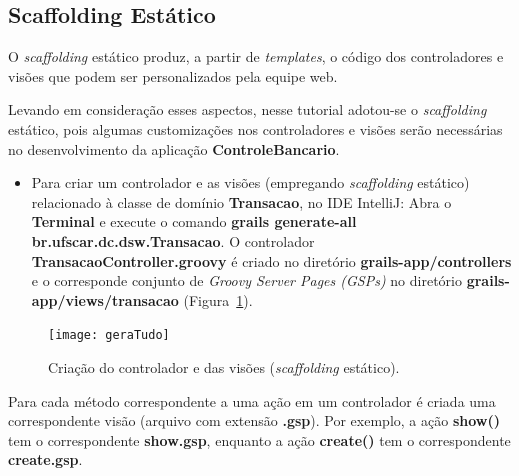 \subsection{Scaffolding Estático}\label{secEstatico} 

\vspace{0.5cm}

O {\it scaffolding}  estático produz, a partir de {\it  templates}, o código dos
controladores e visões que podem ser personalizados pela equipe web.  

\vspace{0.2cm}

Levando  em  consideração  esses  aspectos,  nesse  tutorial  adotou-se  o  {\it
  scaffolding} estático,  pois algumas customizações nos  controladores e visões
serão necessárias no desenvolvimento da aplicação {\bf ControleBancario}.

\begin{itemize}

\vspace{0.2cm}

\item  Para criar  um  controlador  e as  visões  (empregando {\it  scaffolding}
  estático) relacionado  à classe de  domínio {\bf Transacao}, no  IDE IntelliJ:
  Abra  o  {\bf   Terminal}  e  execute  o  comando   {\bf  grails  generate-all
    br.ufscar.dc.dsw.Transacao}. O  controlador {\bf TransacaoController.groovy}
  é criado no diretório {\bf grails-app/controllers} e o corresponde conjunto de
  {\em     Groovy     Server     Pages     (GSPs)}     no     diretório     {\bf
    grails-app/views/transacao}                       (Figura~\ref{geraTudoFig}).

\end{itemize}

\vspace{0.5cm}

\begin{figure}[htbp]
\centering\texttt{[image: geraTudo]}
\caption{Criação do controlador e das visões ({\it scaffolding} estático).}
\label{geraTudoFig}
\end{figure}

\vspace{0.5cm}

 Para  cada método  correspondente a  uma ação  em um
controlador  é  criada  uma  correspondente  visão (arquivo  com  extensão  {\bf
  .gsp}). Por exemplo, a ação  {\bf show()} tem o correspondente {\bf show.gsp},
enquanto a ação {\bf create()} tem o correspondente {\bf create.gsp}. 

